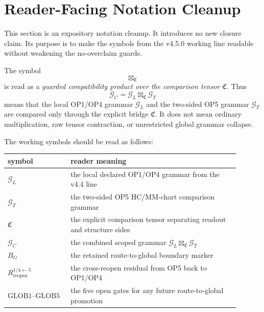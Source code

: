 
\section{Reader-Facing Notation Cleanup}
\label{sec:v450-r14-reader-facing-notation-cleanup}

This section is an expository notation cleanup.  It introduces no new closure
claim.  Its purpose is to make the symbols from the v4.5.0 working line readable
without weakening the no-overclaim guards.

\begin{definition}
The symbol
\[
    \boxtimes_{\mathfrak C}
\]
is read as a \emph{guarded compatibility product over the comparison tensor}
\(\mathfrak C\).  Thus
\[
    \mathcal G_C
    =
    \mathcal G_L \boxtimes_{\mathfrak C} \mathcal G_T
\]
means that the local OP1/OP4 grammar \(\mathcal G_L\) and the two-sided OP5
grammar \(\mathcal G_T\) are compared only through the explicit bridge
\(\mathfrak C\).  It does not mean ordinary multiplication, raw tensor
contraction, or unrestricted global grammar collapse.
\end{definition}

\begin{definition}
The working symbols should be read as follows:
\begin{center}
\begin{tabular}{>{\raggedright\arraybackslash}p{0.22\linewidth}|>{\raggedright\arraybackslash}p{0.68\linewidth}}
\textbf{symbol} & \textbf{reader meaning}\\
\hline
\(\mathcal G_L\) & the local declared OP1/OP4 grammar from the v4.4 line\\
\(\mathcal G_T\) & the two-sided OP5 HC/MM-chart comparison grammar\\
\(\mathfrak C\) & the explicit comparison tensor separating readout and structure sides\\
\(\mathcal G_C\) & the combined scoped grammar \(\mathcal G_L\boxtimes_{\mathfrak C}\mathcal G_T\)\\
\(B_G\) & the retained route-to-global boundary marker\\
\(R_{\mathrm{reopen}}^{1/4\leftarrow 5}\) & the cross-reopen residual from OP5 back to OP1/OP4\\
\(\mathrm{GLOB1}\text{--}\mathrm{GLOB5}\) & the five open gates for any future route-to-global promotion
\end{tabular}
\end{center}
\end{definition}

